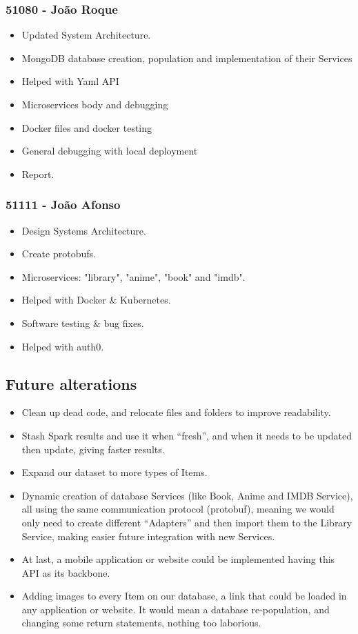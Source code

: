 \documentclass[oneside]{article}
\begin{document}
    \subsubsection{51080 - João Roque}
      \begin{itemize}
        \item Updated System Architecture.
        \item MongoDB database creation, population and implementation of their Services
        \item Helped with Yaml API
        \item Microservices body and debugging
        \item Docker files and docker testing
        \item General debugging with local deployment
        \item Report.
      \end{itemize}
    \subsubsection{51111 - João Afonso}
        \begin{itemize}
        	\item Design Systems Architecture.
        	\item Create protobufs.
        	\item Microservices: "library", "anime", "book" and "imdb".
        	\item Helped with Docker \& Kubernetes.
       		\item Software testing \& bug fixes.
        	\item Helped with auth0.
      	\end{itemize}

  \subsection{Future alterations}
  \label{sec:alterations}
  \begin{itemize}
    \item Clean up dead code, and relocate files and folders to improve readability.
    \item Stash Spark results and use it when “fresh”, and when it needs to be updated then update, giving faster results.
    \item Expand our dataset to more types of Items.
    \item Dynamic creation of database Services (like Book, Anime and IMDB Service), all using the same communication protocol (protobuf), meaning we would only need to create different “Adapters” and then import them to the Library Service, making easier future integration with new Services.
    \item At last, a mobile application or website could be implemented having this API as its backbone.
    \item Adding images to every Item on our database, a link that could be loaded in any application or website. It would mean a database re-population, and changing some return statements, nothing too laborious.
  \end{itemize}
\end{document}
